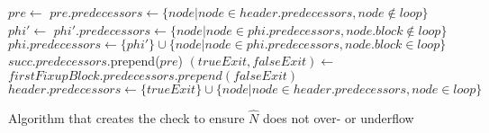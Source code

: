 \begin{algorithm}[H]
    \begin{algorithmic}
            \State $pre \gets $ 
            \State $pre.predecessors \gets \{node \vert node \in header.predecessors, node \notin loop\}$
                \State $phi' \gets $ 
                \State $phi'.predecessors \gets \{node \vert node \in phi.predecessors, node.block \notin loop\}$
                \State $phi.predecessors \gets \{phi'\} \cup \{node \vert node \in phi.predecessors, node.block \in loop\}$
                        \State $succ.predecessors$.prepend($pre$)
                    \EndIf
                \EndFor
            \EndFor
            \State $(trueExit, falseExit) \gets $
            \State $firstFixupBlock.predecessors.prepend(falseExit)$
            \State $header.predecessors \gets \{trueExit\} \cup \{node \vert node \in header.predecessors, node \in loop\}$
        \EndFunction
    \end{algorithmic}
    \caption{Algorithm that creates the check to ensure $\hat{N}$ does not over- or underflow}
    \label{alg:impl:fixup:header-cond:preheader}
\end{algorithm}
